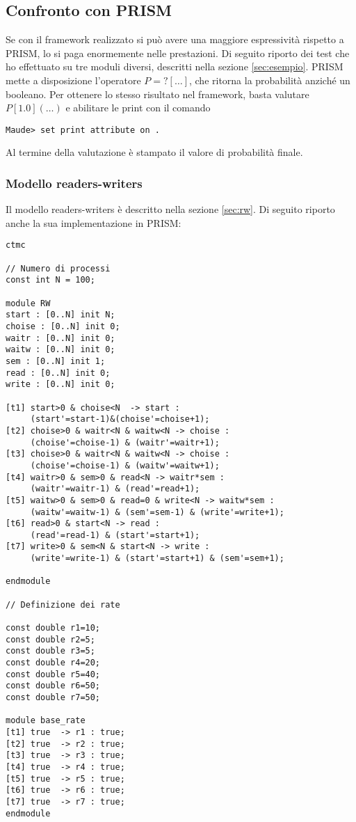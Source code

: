 \subsection{Confronto con PRISM}

Se con il framework realizzato si può avere una maggiore espressività
rispetto a PRISM, lo si paga enormemente nelle prestazioni. Di seguito riporto
dei test che ho effettuato su tre moduli diversi, descritti nella sezione
\ref{sec:esempio}. PRISM mette a disposizione l'operatore $P=?[ \ldots ]$, che
ritorna la probabilità anziché un booleano. Per ottenere lo stesso risultato nel
framework, basta valutare $P[1.0]( \ldots )$ e abilitare le print con il comando
\begin{Verbatim}
Maude> set print attribute on .
\end{Verbatim}
Al termine della valutazione è stampato il valore di probabilità finale.

\subsubsection{Modello readers-writers}

Il modello readers-writers è descritto nella sezione \ref{sec:rw}. Di seguito
riporto anche la sua implementazione in PRISM:
\begin{Verbatim}[fontsize=\small]
ctmc

// Numero di processi
const int N = 100;

module RW
start : [0..N] init N;
choise : [0..N] init 0;
waitr : [0..N] init 0;
waitw : [0..N] init 0;
sem : [0..N] init 1;
read : [0..N] init 0;
write : [0..N] init 0;

[t1] start>0 & choise<N  -> start :
     (start'=start-1)&(choise'=choise+1);
[t2] choise>0 & waitr<N & waitw<N -> choise :
     (choise'=choise-1) & (waitr'=waitr+1);
[t3] choise>0 & waitr<N & waitw<N -> choise :
     (choise'=choise-1) & (waitw'=waitw+1);
[t4] waitr>0 & sem>0 & read<N -> waitr*sem :
     (waitr'=waitr-1) & (read'=read+1);
[t5] waitw>0 & sem>0 & read=0 & write<N -> waitw*sem :
     (waitw'=waitw-1) & (sem'=sem-1) & (write'=write+1);
[t6] read>0 & start<N -> read :
     (read'=read-1) & (start'=start+1);
[t7] write>0 & sem<N & start<N -> write :
     (write'=write-1) & (start'=start+1) & (sem'=sem+1);

endmodule

// Definizione dei rate

const double r1=10;
const double r2=5;
const double r3=5;
const double r4=20;
const double r5=40;
const double r6=50;
const double r7=50;

module base_rate 
[t1] true  -> r1 : true;
[t2] true  -> r2 : true;
[t3] true  -> r3 : true;
[t4] true  -> r4 : true;
[t5] true  -> r5 : true;
[t6] true  -> r6 : true;
[t7] true  -> r7 : true;
endmodule
\end{Verbatim}

